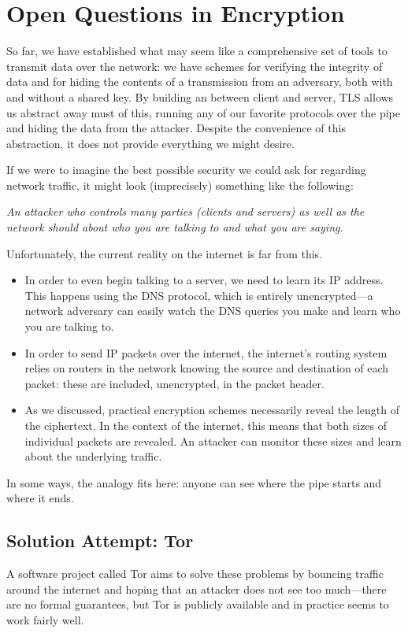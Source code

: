 \chapter{Open Questions in Encryption}

So far, we have established what may seem like a comprehensive set of tools to transmit data over the network: we have schemes for verifying the integrity of data and for hiding the contents of a transmission from an adversary, both with and without a shared key. By building an  between client and server, TLS allows us abstract away must of this, running any of our favorite protocols over the pipe and hiding the data from the attacker. Despite the convenience of this abstraction, it does not provide everything we might desire.

If we were to imagine the best possible security we could ask for regarding network traffic, it might look (imprecisely) something like the following:

\emph{An attacker who controls many parties (clients and servers) as well as the network should  about who you are talking to and what you are saying.}

Unfortunately, the current reality on the internet is far from this.
\begin{itemize}
	\item In order to even begin talking to a server, we need to learn its IP address. This happens using the DNS protocol, which is entirely unencrypted---a network adversary can easily watch the DNS queries you make and learn who you are talking to.
	\item In order to send IP packets over the internet, the internet's routing system relies on routers in the network knowing the source and destination of each packet: these are included, unencrypted, in the packet header. 
	\item As we discussed, practical encryption schemes necessarily reveal the length of the ciphertext. In the context of the internet, this means that both sizes of individual packets are revealed. An attacker can monitor these sizes and learn about the underlying traffic.
\end{itemize}

In some ways, the  analogy fits here: anyone can see where the pipe starts and where it ends.

\section{Solution Attempt: Tor}
A software project called Tor aims to solve these problems by bouncing traffic around the internet and hoping that an attacker does not see too much---there are no formal guarantees, but Tor is publicly available and in practice seems to work fairly well.

